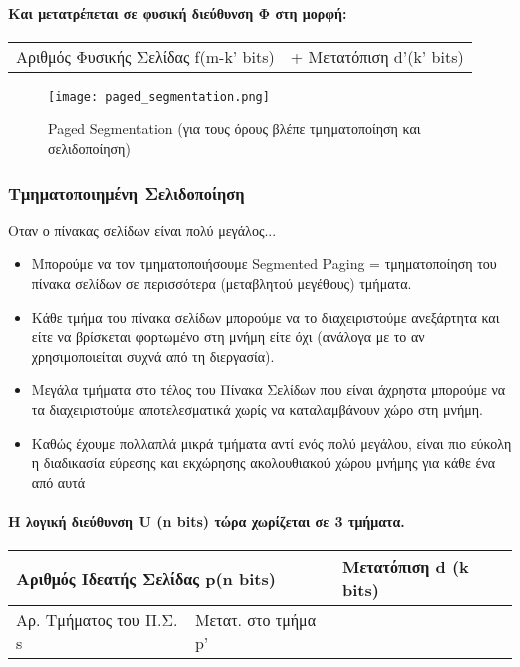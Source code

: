 \paragraph{Και μετατρέπεται σε φυσική διεύθυνση Φ στη μορφή:}
\begin{center}
\begin{tabularx}{0.95\textwidth}{X X}
Αριθμός Φυσικής Σελίδας f(m-k' bits) & + Μετατόπιση d'(k' bits)
\end{tabularx}
\end{center}

\begin{figure}[!ht]
	\texttt{[image: paged\_segmentation.png]}
	\caption{Paged Segmentation (για τους όρους βλέπε τμηματοποίηση και σελιδοποίηση)}
\end{figure}

\subsubsection{Τμηματοποιημένη Σελιδοποίηση}

Οταν ο πίνακας σελίδων είναι πολύ μεγάλος...
\begin{itemize}
	\item	Μπορούμε να τον τμηματοποιήσουμε Segmented Paging = τμηματοποίηση του πίνακα σελίδων 
		σε περισσότερα (μεταβλητού μεγέθους) τμήματα.
	\item	Κάθε τμήμα του πίνακα σελίδων μπορούμε να το διαχειριστούμε
		ανεξάρτητα και είτε να βρίσκεται φορτωμένο στη μνήμη είτε όχι
		(ανάλογα με το αν χρησιμοποιείται συχνά από τη διεργασία).
	\item	Μεγάλα τμήματα στο τέλος του Πίνακα Σελίδων που είναι
		άχρηστα μπορούμε να τα διαχειριστούμε αποτελεσματικά χωρίς
		να καταλαμβάνουν χώρο στη μνήμη.
	\item	Καθώς έχουμε πολλαπλά μικρά τμήματα αντί ενός πολύ μεγάλου,
		είναι πιο εύκολη η διαδικασία εύρεσης και εκχώρησης
		ακολουθιακού χώρου μνήμης για κάθε ένα από αυτά
\end{itemize}


\paragraph{Η λογική διεύθυνση U (n bits) τώρα χωρίζεται σε 3 τμήματα.}

\begin{center}
\begin{tabularx}{0.95\textwidth}{|X|X|X|}
\hline
\multicolumn{2}{|l|}{Αριθμός Ιδεατής Σελίδας p(n bits)} & {Μετατόπιση d (k bits)} \\
\hline
Αρ. Τμήματος του Π.Σ. s & Μετατ. στο τμήμα p' & {} \\
\hline
\end{tabularx}
\end{center}


